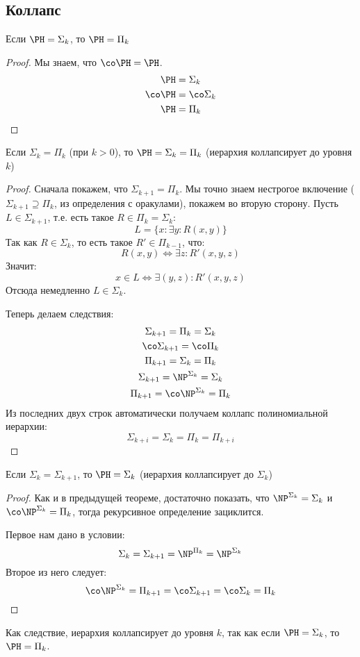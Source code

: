 \subsection{Коллапс}
	\begin{assertion}
		Если $\PH=\Sigma_k$, то $\PH=\Pi_k$
	\end{assertion}
	\begin{proof}
		Мы знаем, что $\co\PH = \PH$.
		\begin{align*}
			\PH &= \Sigma_k \\
			\co\PH &= \co\Sigma_k \\
			\PH &= \Pi_k
		\end{align*}
	\end{proof}

	\begin{theorem}
		Если $\Sigma_k=\Pi_k$ (при $k>0$), то $\PH=\Sigma_k=\Pi_k$ (иерархия коллапсирует до уровня $k$)
	\end{theorem}
	\begin{proof}
		Сначала покажем, что $\Sigma_{k+1} = \Pi_k$.
		Мы точно знаем нестрогое включение ($\Sigma_{k+1} \supseteq \Pi_k$, из определения с оракулами), покажем во вторую сторону.
		Пусть $L \in \Sigma_{k+1}$, т.е. есть такое $R \in \Pi_k=\Sigma_k$:
		\[ L = \{ x \colon \exists y \colon R(x, y) \} \]
		Так как $R \in \Sigma_k$, то есть такое $R' \in \Pi_{k-1}$, что:
		\[ R(x, y) \iff \exists z \colon R'(x, y, z) \]
		Значит:
		\[ x \in L \iff \exists (y, z) \colon R'(x, y, z) \]
		Отсюда немедленно $L \in \Sigma_k$.

		Теперь делаем следствия:
		\begin{gather*}
			\Sigma_{k+1} = \Pi_k = \Sigma_k \\
			\co\Sigma_{k+1} = \co\Pi_k \\
			\Pi_{k+1} = \Sigma_k = \Pi_k \\
			\Sigma_{k+1} = \NP^{\Sigma_k} = \Sigma_k \\
			\Pi_{k+1} = \co\NP^{\Sigma_k} = \Pi_k
		\end{gather*}
		Из последних двух строк автоматически получаем коллапс полиномиальной иерархии:
		\[ \Sigma_{k+i} = \Sigma_k = \Pi_k = \Pi_{k+i} \]
	\end{proof}

	\begin{theorem}
		Если $\Sigma_k=\Sigma_{k+1}$, то $\PH=\Sigma_k$ (иерархия коллапсирует до $\Sigma_{k}$)
	\end{theorem}
	\begin{proof}
		Как и в предыдущей теореме, достаточно показать, что $\NP^{\Sigma_k}=\Sigma_k$ и $\co\NP^{\Sigma_k}=\Pi_k$,
		тогда рекурсивное определение зациклится.

		Первое нам дано в условии:
		\[ \Sigma_k=\Sigma_{k+1}=\NP^{\Pi_k}=\NP^{\Sigma_k} \]
		Второе из него следует:
		\[
			\co\NP^{\Sigma_k} = \Pi_{k+1} = \co\Sigma_{k+1} = \co\Sigma_k = \Pi_k
		\]
	\end{proof}
	\begin{conseq}
		Как следствие, иерархия коллапсирует до уровня $k$, так как если $\PH=\Sigma_k$, то $\PH=\Pi_k$.
	\end{conseq}

